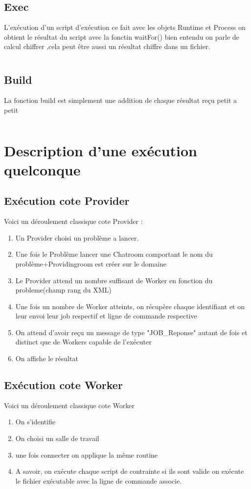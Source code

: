 \documentclass[11pt]{report}
\begin{document}
\subsection{Exec} 
L\textquoteright exécution d'un script d'exécution ce fait avec les objets Runtime et Process on obtient le résultat du script avec la fonctin waitFor() bien entendu on parle de calcul chiffrer ,cela peut être aussi un résultat chiffre dans un fichier. 
\inputminted[tabsize=2,frame=lines,linenos]{Perl}{Fichier_import/calcul.pl}
\newpage
\subsection{Build} 
La fonction build est simplement une addition de chaque résultat reçu petit a petit 
\inputminted[tabsize=2,frame=lines,linenos]{java}{Fichier_import/build.java}
\newpage
\section{Description d'une exécution quelconque} 
\subsection{Exécution cote Provider}
Voici un déroulement classique cote Provider :
\begin{enumerate}
\item Un Provider choisi un problème a lancer.
\item Une fois le Problème lancer une Chatroom comportant le nom du problème+Providingroom est créer sur le domaine
\item Le Provider attend un nombre suffisant de Worker en fonction du probleme(champ rang du XML)
\item Une fois un nombre de Worker atteints, on récupère chaque identifiant et on leur envoi leur job respectif et ligne de commande respective
\item On attend d'avoir reçu un message de type "JOB\_Reponse" autant de fois et distinct que de Workers capable de l'exécuter 
\item On affiche le résultat
\end{enumerate}

\subsection{Exécution cote Worker}
Voici un déroulement classique cote Worker
\begin{enumerate}
\item On s'identifie
\item On choisi un salle de travail 
\item une fois connecter on applique la même routine 
\item A savoir, on exécute chaque script de contrainte si ils sont valide on exécute le fichier exécutable avec la ligne de commande associe.
\end{enumerate}
\end{document}
